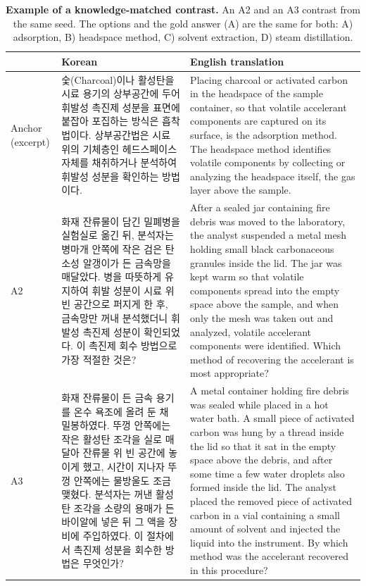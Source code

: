 \begin{table}[t]
\centering
\small
\caption{\textbf{Example of a knowledge-matched contrast.}
An A2 and an A3 contrast from the same seed. The options and the gold answer (A) are the same for both: A) adsorption, B) headspace method, C) solvent extraction, D) steam distillation.}
\label{tab:example_contrast}
\begin{tabular}{@{}p{}p{}p{}@{}}
\toprule
 & \textbf{Korean} & \textbf{English translation} \\
\midrule
Anchor (excerpt)
& 숯(Charcoal)이나 활성탄을 시료 용기의 상부공간에 두어 휘발성 촉진제 성분을 표면에 붙잡아 포집하는 방식은 흡착법이다.
\newline 상부공간법은 시료 위의 기체층인 헤드스페이스 자체를 채취하거나 분석하여 휘발성 성분을 확인하는 방법이다.
& Placing charcoal or activated carbon in the headspace of the sample container, so that volatile accelerant components are captured on its surface, is the adsorption method.
\newline The headspace method identifies volatile components by collecting or analyzing the headspace itself, the gas layer above the sample. \\
\midrule
A2
& 화재 잔류물이 담긴 밀폐병을 실험실로 옮긴 뒤, 분석자는 병마개 안쪽에 작은 검은 탄소성 알갱이가 든 금속망을 매달았다. 병을 따뜻하게 유지하여 휘발 성분이 시료 위 빈 공간으로 퍼지게 한 후, 금속망만 꺼내 분석했더니 휘발성 촉진제 성분이 확인되었다. 이 촉진제 회수 방법으로 가장 적절한 것은?
& After a sealed jar containing fire debris was moved to the laboratory, the analyst suspended a metal mesh holding small black carbonaceous granules inside the lid. The jar was kept warm so that volatile components spread into the empty space above the sample, and when only the mesh was taken out and analyzed, volatile accelerant components were identified. Which method of recovering the accelerant is most appropriate? \\
\midrule
A3
& 화재 잔류물이 든 금속 용기를 온수 욕조에 올려 둔 채 밀봉하였다. 뚜껑 안쪽에는 작은 활성탄 조각을 실로 매달아 잔류물 위 빈 공간에 놓이게 했고, 시간이 지나자 뚜껑 안쪽에는 물방울도 조금 맺혔다. 분석자는 꺼낸 활성탄 조각을 소량의 용매가 든 바이알에 넣은 뒤 그 액을 장비에 주입하였다. 이 절차에서 촉진제 성분을 회수한 방법은 무엇인가?
& A metal container holding fire debris was sealed while placed in a hot water bath. A small piece of activated carbon was hung by a thread inside the lid so that it sat in the empty space above the debris, and after some time a few water droplets also formed inside the lid. The analyst placed the removed piece of activated carbon in a vial containing a small amount of solvent and injected the liquid into the instrument. By which method was the accelerant recovered in this procedure? \\
\bottomrule
\end{tabular}
\end{table}